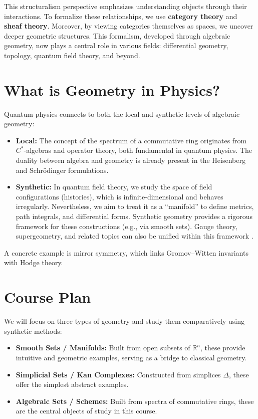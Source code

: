 This structuralism perspective emphasizes understanding objects through their interactions. To formalize these relationships, we use \textbf{category theory} and \textbf{sheaf theory}. Moreover, by viewing categories themselves as spaces, we uncover deeper geometric structures. This formalism, developed through algebraic geometry, now plays a central role in various fields: differential geometry, topology, quantum field theory, and beyond.

\section{What is Geometry in Physics?}

Quantum physics connects to both the local and synthetic levels of algebraic geometry:

\begin{itemize}
  \item \textbf{Local:} The concept of the spectrum of a commutative ring originates from $C^*$-algebras and operator theory, both fundamental in quantum physics. The duality between algebra and geometry is already present in the Heisenberg and Schrödinger formulations.

  \item \textbf{Synthetic:} In quantum field theory, we study the space of field configurations (histories), which is infinite-dimensional and behaves irregularly. Nevertheless, we aim to treat it as a “manifold” to define metrics, path integrals, and differential forms. Synthetic geometry provides a rigorous framework for these constructions (e.g., via smooth sets). Gauge theory, supergeometry, and related topics can also be unified within this framework \cite{nlab:geometry_of_physics}.
\end{itemize}

A concrete example is mirror symmetry, which links Gromov–Witten invariants with Hodge theory.

\section{Course Plan}

We will focus on three types of geometry and study them comparatively using synthetic methods:

\begin{itemize}
  \item \textbf{Smooth Sets / Manifolds:} Built from open subsets of $\mathbb{R}^n$, these provide intuitive and geometric examples, serving as a bridge to classical geometry.

  \item \textbf{Simplicial Sets / Kan Complexes:} Constructed from simplices $\Delta$, these offer the simplest abstract examples.

  \item \textbf{Algebraic Sets / Schemes:} Built from spectra of commutative rings, these are the central objects of study in this course.
\end{itemize}
